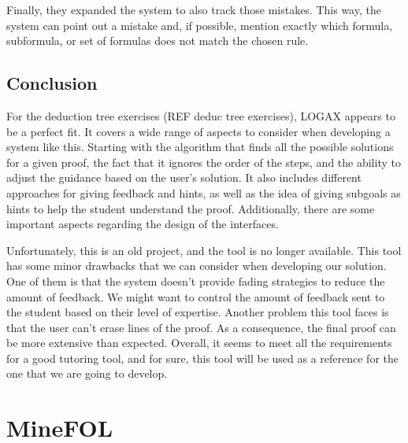 Finally, they expanded the system to also track those mistakes. This way, the system can point out a mistake and, if possible, mention exactly which formula, subformula, or set of formulas does not match the chosen rule.

\subsection{Conclusion}
For the deduction tree exercises (REF deduc tree exercises), LOGAX appears to be a perfect fit. It covers a wide range of aspects to consider when developing a system like this. Starting with the algorithm that finds all the possible solutions for a given proof, the fact that it ignores the order of the steps, and the ability to adjust the guidance based on the user's solution. It also includes different approaches for giving feedback and hints, as well as the idea of giving subgoals as hints to help the student understand the proof. Additionally, there are some important aspects regarding the design of the interfaces.

Unfortunately, this is an old project, and the tool is no longer available. This tool has some minor drawbacks that we can consider when developing our solution. One of them is that the system doesn't provide fading strategies to reduce the amount of feedback. We might want to control the amount of feedback sent to the student based on their level of expertise. Another problem this tool faces is that the user can't erase lines of the proof. As a consequence, the final proof can be more extensive than expected. Overall, it seems to meet all the requirements for a good tutoring tool, and for sure, this tool will be used as a reference for the one that we are going to develop.

\section{MineFOL}

